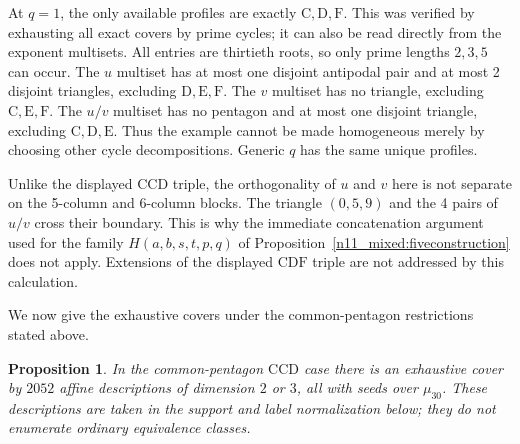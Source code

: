 \documentclass[11pt,a4paper]{article}
\newtheorem{proposition}[theorem]{Proposition}
\theoremstyle{plain}
\theoremstyle{definition}
\theoremstyle{plain}
\begin{document}
At $q=1$, the only available profiles are exactly $\mathrm{C},\mathrm{D},\mathrm{F}$. This was verified by exhausting all exact covers by prime cycles; it can also be read directly from the exponent multisets. All entries are thirtieth roots, so only prime lengths $2,3,5$ can occur. The $u$ multiset has at most one disjoint antipodal pair and at most 2 disjoint triangles, excluding $\mathrm{D},\mathrm{E},\mathrm{F}$. The $v$ multiset has no triangle, excluding $\mathrm{C},\mathrm{E},\mathrm{F}$. The $u/v$ multiset has no pentagon and at most one disjoint triangle, excluding $\mathrm{C},\mathrm{D},\mathrm{E}$. Thus the example cannot be made homogeneous merely by choosing other cycle decompositions. Generic $q$ has the same unique profiles.

Unlike the displayed $\mathrm{CCD}$ triple, the orthogonality of $u$ and $v$ here is not separate on the 5-column and 6-column blocks. The triangle $(0,5,9)$ and the 4 pairs of $u/v$ cross their boundary. This is why the immediate concatenation argument used for the family $H(a,b,s,t,p,q)$ of Proposition~\ref{n11_mixed:fiveconstruction} does not apply. Extensions of the displayed $\mathrm{CDF}$ triple are not addressed by this calculation.

\medskip
We now give the exhaustive covers under the common-pentagon restrictions stated above.

\par\addvspace{\medskipamount}\noindent
\begin{minipage}{\linewidth}
\begin{proposition}\label{n11_mixed:CCDcover}
In the common-pentagon $\mathrm{CCD}$ case there is an exhaustive cover by $2052$ affine descriptions of dimension $2$ or $3$, all with seeds over $\mu_{30}$. These descriptions are taken in the support and label normalization below; they do not enumerate ordinary equivalence classes.
\end{proposition}
\end{minipage}
\par\addvspace{\medskipamount}
\end{document}
